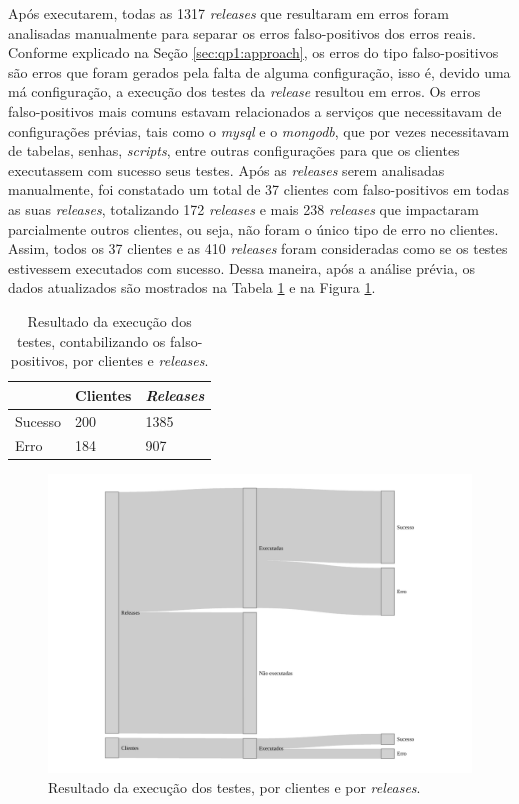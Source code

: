 Após executarem, todas as 1317 \textit{releases} que resultaram em erros foram analisadas manualmente para separar os erros falso-positivos dos erros reais. Conforme explicado na Seção \ref{sec:qp1:approach}, os erros do tipo falso-positivos são erros que foram gerados pela falta de alguma configuração, isso é, devido uma má configuração, a execução dos testes da \textit{release} resultou em erros. Os erros falso-positivos mais comuns estavam relacionados a serviços que necessitavam de configurações prévias, tais como o \textit{mysql} e o \textit{mongodb}, que por vezes necessitavam de tabelas, senhas, \textit{scripts}, entre outras configurações para que os clientes executassem com sucesso seus testes. Após as \textit{releases} serem analisadas manualmente, foi constatado um total de 37 clientes com falso-positivos em todas as suas \textit{releases}, totalizando 172 \textit{releases} e mais 238 \textit{releases} que impactaram parcialmente outros clientes, ou seja, não foram o único tipo de erro no clientes. Assim, todos os 37 clientes e as 410 \textit{releases} foram consideradas como se os testes estivessem executados com sucesso. Dessa maneira, após a análise prévia, os dados atualizados são mostrados na Tabela \ref{tab:res_rq1_2} e na Figura \ref{fig:res_rq1_g}.

\begin{table}[]
\centering
\begin{tabular}{|l|l|l|}
\hline
                    & Clientes & \textit{Releases} \\ \hline
    Sucesso         & 200     & 1385     \\
    Erro            & 184     & 907     \\ \hline
\end{tabular}
\caption{Resultado da execução dos testes, contabilizando os falso-positivos, por clientes e \textit{releases}.}
\label{tab:res_rq1_2}
\end{table}

\begin{figure}
    \centering
    \includegraphics[scale=0.7]{figuras/general_results.pdf}
    \caption{Resultado da execução dos testes, por clientes e por \textit{releases}.}
    \label{fig:res_rq1_g}
\end{figure}{}

